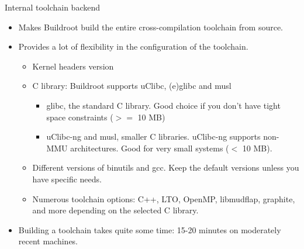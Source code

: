 \begin{frame}{Internal toolchain backend}
  \begin{itemize}
  \item Makes Buildroot build the entire cross-compilation toolchain
    from source.
  \item Provides a lot of flexibility in the configuration of the
    toolchain.
    \begin{itemize}
    \item Kernel headers version
    \item C library: Buildroot supports uClibc, (e)glibc and musl
      \begin{itemize}
      \item glibc, the standard C library. Good choice if you don't
        have tight space constraints ($>=$ 10 MB)
      \item uClibc-ng and musl, smaller C libraries. uClibc-ng supports
        non-MMU architectures. Good for very small systems ($<$ 10 MB).
      \end{itemize}
    \item Different versions of binutils and gcc. Keep the default
      versions unless you have specific needs.
    \item Numerous toolchain options: C++, LTO, OpenMP, libmudflap,
      graphite, and more depending on the selected C library.
    \end{itemize}
  \item Building a toolchain takes quite some time: 15-20 minutes on
    moderately recent machines.
  \end{itemize}
\end{frame}

